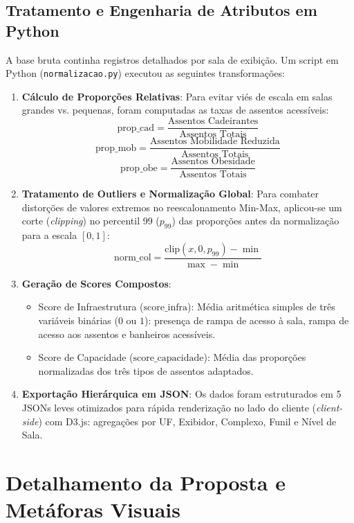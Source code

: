 \documentclass[12pt]{article}
\begin{document}
\subsection{Tratamento e Engenharia de Atributos em Python}

A base bruta continha registros detalhados por sala de exibição. 
Um script em Python (\texttt{normalizacao.py}) executou as seguintes transformações:

\begin{enumerate}
    \item \textbf{Cálculo de Proporções Relativas}: Para evitar viés de escala em salas grandes vs. pequenas, foram computadas as taxas de assentos acessíveis:
    \[
    \text{prop\_cad} = \frac{\text{Assentos Cadeirantes}}{\text{Assentos Totais}}
    \]
    \[
    \text{prop\_mob} = \frac{\text{Assentos Mobilidade Reduzida}}{\text{Assentos Totais}}
    \]
    \[
    \text{prop\_obe} = \frac{\text{Assentos Obesidade}}{\text{Assentos Totais}}
    \]
    
    \item \textbf{Tratamento de Outliers e Normalização Global}: Para combater distorções de valores extremos no reescalonamento Min-Max, aplicou-se um corte (\textit{clipping}) no percentil 99 ($p_{99}$) das proporções antes da normalização para a escala $[0, 1]$:
    \[
    \text{norm\_col} = \frac{\text{clip}(x, 0, p_{99}) - \min}{\max - \min}
    \]
    
    \item \textbf{Geração de Scores Compostos}:
      \begin{itemize}
          \item Score de Infraestrutura ($\text{score\_infra}$): Média aritmética simples de três variáveis binárias ($0$ ou $1$): presença de rampa de acesso à sala, rampa de acesso aos assentos e banheiros acessíveis.
          \item Score de Capacidade ($\text{score\_capacidade}$): Média das proporções normalizadas dos três tipos de assentos adaptados.
      \end{itemize}
    \item \textbf{Exportação Hierárquica em JSON}: Os dados foram estruturados em 5 JSONs leves otimizados para rápida renderização no lado do cliente (\textit{client-side}) com D3.js: agregações por UF, Exibidor, Complexo, Funil e Nível de Sala.
\end{enumerate}

\section{Detalhamento da Proposta e Metáforas Visuais}
\end{document}
